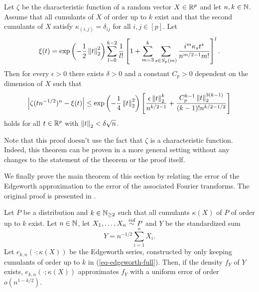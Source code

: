 \begin{theorem} \label{thm-edge-inv-tech}
    Let $\zeta$ be the characteristic function of a random vector $X \in {\mathbb{R}^p}$ and let $n, k \in \mathbb{N}$. Assume that all cumulants of $X$ of order up to $k$ exist and that the second cumulants of $X$ satisfy $\kappa_{(i, j)} = \delta_{ij}$ for all $i, j \in [p]$. Let
    \begin{equation} \label{eq-edgeworth-fourier}
        \xi(t) = \exp\left(-\frac{1}{2}\left\lVert t\right\rVert_2^2\right)\sum_{l=0}^{k-2} \frac{1}{l!} \left[ 1 + \sum_{m=3}^k \sum_{s \in S_p(m)} \frac{i^m\kappa_s t^s}{n^{m/2-1}m!} \right]^l.
    \end{equation}
    Then for every $\epsilon > 0$ there exists $\delta > 0$ and a constant $C_p > 0$ dependent on the dimension of $X$ such that 
    \begin{equation}\label{eq-edge-bound}
        \left|\zeta(t n^{-1/2})^n - \xi(t)\right| \leq \exp\left(-\frac{1}{4}\left\lVert t\right\rVert_2^2\right)\left[ \frac{\epsilon\left\lVert t\right\rVert_2^k}{n^{k/2-1}} + \frac{C_p^{k-1}\left\lVert t\right\rVert_2^{3(k-1)}}{(k-1)!n^{k/2-1/2}} \right]
    \end{equation}
    holds for all $t \in {\mathbb{R}^p}$ with $\left\lVert t\right\rVert_2 < \delta\sqrt{n}$.
\end{theorem}


Note that this proof doesn't use the fact that $\zeta$ is a characteristic function. Indeed, this theorem can be proven in a more general setting without any changes to the statement of the theorem or the proof itself.

We finally prove the main theorem of this section by relating the error of the Edgeworth approximation to the error of the associated Fourier transforms. The original proof is presented in \cite[Theorem 3.5.1]{kolassa2006series}.

\begin{theorem} \label{thm-edgeworth}
    Let $P$ be a distribution and $k \in \mathbb{N}_{\geq 2}$ such that all cumulants $\kappa(X)$ of $P$ of order up to $k$ exist. Let $n \in \mathbb{N}$, let $X_1, \ldots, X_n \stackrel{iid}{\sim} P$ and $Y$ be the standardized sum
    \begin{equation*}
        Y = n^{-1/2}\sum_{i=1}^n X_i.
    \end{equation*}
    Let $e_{k, n}(\cdot; \kappa(X))$ be the Edgeworth series, constructed by only keeping cumulants of order up to $k$ in (\ref{eq-edgeworth-full}). Then, if the density $f_Y$ of $Y$ exists, $e_{k, n}(\cdot; \kappa(X))$ approximates $f_Y$ with a uniform error of order $o(n^{1 - k/2})$.
\end{theorem}
